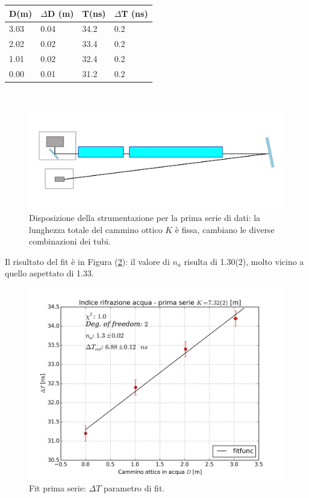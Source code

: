 \documentclass[journal, a4paper]{IEEEtran}
\begin{document}
\begin{table}
\centering
\begin{tabular}{l|l|l|l}
\hline
D(m) & $\Delta$D (m) & T(ns) & $\Delta$T (ns)\\
\hline
3.03 & 0.04 & 34.2 & 0.2 \\
2.02 & 0.02 & 33.4 & 0.2 \\
1.01 & 0.02 & 32.4 & 0.2 \\
0.00 & 0.01 & 31.2 & 0.2 \\
\hline
\end{tabular}
\end{table}
~\\

\begin{figure}
\centering
\includegraphics[width=0.9\linewidth]{./disegn_primaserie}
\caption{Disposizione della strumentazione per la prima serie di dati: la lunghezza totale del cammino ottico $K$ è fissa, cambiano le diverse combinazioni dei tubi.}
\label{fig:disegn_primaserie}
\end{figure}


Il risultato del fit è in Figura (\ref{fig:indice_primaserie_tret}): il valore di $n_a$ risulta di 1.30(2), molto vicino a quello aspettato di 1.33.

\begin{figure}
\centering
\includegraphics[width=0.9\linewidth]{./indice_primaserie_tret}
\caption{Fit prima serie: $\Delta T$ parametro di fit.}
\label{fig:indice_primaserie_tret}
\end{figure}
\end{document}
